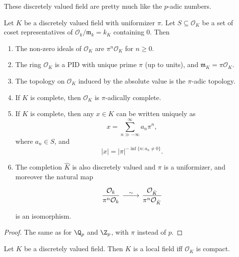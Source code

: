 \documentclass[a4paper]{article}
\begin{document}
These discretely valued field are pretty much like the $p$-adic numbers.
\begin{prop}
  Let $K$ be a discretely valued field with uniformizer $\pi$. Let $S \subseteq \mathcal{O}_K$ be a set of coset representatives of $\mathcal{O}_k/\mathfrak{m}_k = k_K$ containing $0$. Then
  \begin{enumerate}
    \item The non-zero ideals of $\mathcal{O}_K$ are $\pi^n \mathcal{O}_K$ for $n \geq 0$.
    \item The ring $\mathcal{O}_K$ is a PID with unique prime $\pi$ (up to units), and $\mathfrak{m}_K = \pi\mathcal{O}_K$.
    \item The topology on $\mathcal{O}_K$ induced by the absolute value is the $\pi$-adic topology.
    \item If $K$ is complete, then $\mathcal{O}_K$ is $\pi$-adically complete.
    \item If $K$ is complete, then any $x \in K$ can be written uniquely as
      \[
        x = \sum_{n \gg -\infty}^\infty a_n \pi^n,
      \]
      where $a_n \in S$, and
      \[
        |x| = |\pi|^{-\inf\{n: a_n \not= 0\}}.
      \]
    \item The completion $\hat{K}$ is also discretely valued and $\pi$ is a uniformizer, and moreover the natural map
      \[
        \begin{tikzcd}
          \displaystyle\frac{\mathcal{O}_k}{\pi^n \mathcal{O}_k} \ar[r, "\sim"] & \displaystyle\frac{\mathcal{O}_{\hat{K}}}{\pi^n \mathcal{O}_{\hat{K}}}
        \end{tikzcd}
      \]
      is an isomorphism.
  \end{enumerate}
\end{prop}

\begin{proof}
  The same as for $\Q_p$ and $\Z_p$, with $\pi$ instead of $p$.
\end{proof}

\begin{prop}
  Let $K$ be a discretely valued field. Then $K$ is a local field iff $\mathcal{O}_K$ is compact.
\end{prop}
\end{document}
